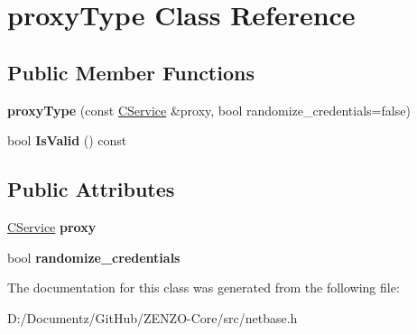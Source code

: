 \hypertarget{classproxy_type}{}\section{proxy\+Type Class Reference}
\label{classproxy_type}
\subsection*{Public Member Functions}
\begin{DoxyCompactItemize}
\item 
\mbox{\label{classproxy_type_ab628e8a0b5e97f2c9f43d24d341600da}} 
{\bfseries proxy\+Type} (const \mbox{\hyperlink{class_c_service}{C\+Service}} \&proxy, bool randomize\+\_\+credentials=false)
\item 
\mbox{\label{classproxy_type_a3f3c9c016b103c8ff5e61d115c188b36}} 
bool {\bfseries Is\+Valid} () const
\end{DoxyCompactItemize}
\subsection*{Public Attributes}
\begin{DoxyCompactItemize}
\item 
\mbox{\label{classproxy_type_a5bd2641d60e071671cbfe4f45e831743}} 
\mbox{\hyperlink{class_c_service}{C\+Service}} {\bfseries proxy}
\item 
\mbox{\label{classproxy_type_ad2539071d9857374f3cd3313a93bef55}} 
bool {\bfseries randomize\+\_\+credentials}
\end{DoxyCompactItemize}


The documentation for this class was generated from the following file\+:\begin{DoxyCompactItemize}
\item 
D\+:/\+Documentz/\+Git\+Hub/\+Z\+E\+N\+Z\+O-\/\+Core/src/netbase.\+h\end{DoxyCompactItemize}
